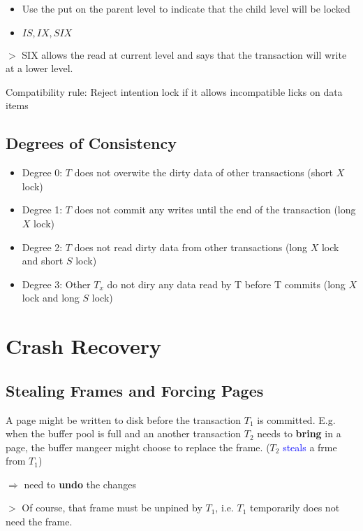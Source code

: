 \documentclass[12pt,a4paper]{article}
\newcommand{\remark}[1]{
    $>$ {\color{blue} #1}
}
\begin{document}
\begin{itemize}
    \item Use the put on the parent level to indicate that the child level will be locked
    \item \(IS,IX,SIX\)
\end{itemize}

\remark{SIX allows the read at current level and says that the transaction will write at a lower level.}

Compatibility rule: Reject intention lock if it allows incompatible licks on data items

\subsection*{Degrees of Consistency}

\begin{itemize}
    \item Degree 0: $T$ does not overwite the dirty data of other transactions (short $X$ lock)
    \item Degree 1: $T$ does not commit any writes until the end of the transaction (long $X$ lock)
    \item Degree 2: $T$ does not read dirty data from other transactions (long $X$ lock and short $S$ lock)
    \item Degree 3: Other $T_x$ do not diry any data read by T before T commits (long $X$ lock and long $S$ lock)
\end{itemize}

\section*{Crash Recovery}

\subsection*{Stealing Frames and Forcing Pages}

A page might be written to disk before the transaction $T_1$ is committed. 
E.g. when the buffer pool is full and an another transaction $T_2$ needs to \textbf{bring} in a page, 
the buffer mangeer might choose to replace the frame. ($T_2$ \textcolor{blue}{steals} a frme from $T_1$)

\(\Rightarrow\) need to \textbf{undo} the changes

\remark{Of course, that frame must be unpined by $T_1$, i.e. $T_1$ temporarily does not need the frame.}
\end{document}
